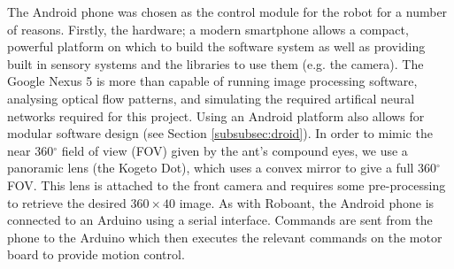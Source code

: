 \documentclass[a4paper,12pt,twoside,openright]{article}
\begin{document}
The Android phone was chosen as the control module for the robot for a number of reasons. Firstly,
the hardware; a modern smartphone allows a compact, powerful platform on which to build the
software system as well as providing built in sensory systems and the libraries to use them (e.g. the
camera). The Google Nexus 5 is more than capable of running image processing software, analysing
optical flow patterns, and simulating the required artifical neural networks required for this project.
Using an Android platform also allows for modular software design (see Section \ref{subsubsec:droid}).
In order to mimic the near 360$^{\circ}$ field of view (FOV) given by the ant's compound eyes, we use a
panoramic lens (the Kogeto Dot), which uses a convex mirror to give a full 360$^{\circ}$ FOV. This
lens is attached to the front camera and requires some pre-processing to retrieve the desired
$360\times40$ image. As with Roboant, the Android phone is connected to an Arduino using a serial
interface. Commands are sent from the phone to the Arduino which then executes the relevant commands
on the motor board to provide motion control.
\end{document}
